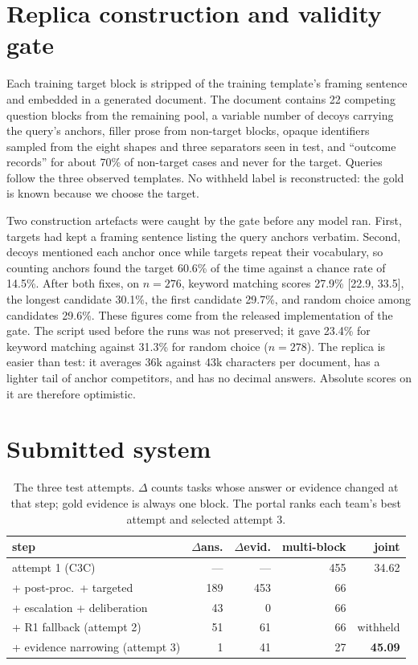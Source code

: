\documentclass[11pt]{article}%
\begin{document}
\appendix
\section{Replica construction and validity gate}
\label{app:replica}

Each training target block is stripped of the training template's framing
sentence and embedded in a generated document. The document contains 22
competing question blocks from the remaining pool, a variable number of
decoys carrying the query's anchors, filler prose from non-target blocks,
opaque identifiers sampled from the eight shapes and three separators seen in
test, and ``outcome records'' for about 70\% of non-target cases and never for
the target. Queries follow the three observed templates. No withheld label is
reconstructed: the gold is known because we choose the target.

Two construction artefacts were caught by the gate before any model ran.
First, targets had kept a framing sentence listing the query anchors
verbatim. Second, decoys mentioned each anchor once while targets repeat their
vocabulary, so counting anchors found the target 60.6\% of the time against a
chance rate of 14.5\%. After both fixes, on $n=276$, keyword matching scores
27.9\% [22.9, 33.5], the longest candidate 30.1\%, the first candidate 29.7\%,
and random choice among candidates 29.6\%. These figures come from the
released implementation of the gate. The script used before the runs was not
preserved; it gave 23.4\% for keyword matching against 31.3\% for random
choice ($n=278$). The replica is easier than test:
it averages 36k against 43k characters per document, has a lighter tail of
anchor competitors, and has no decimal answers. Absolute scores on it are
therefore optimistic.

\section{Submitted system}
\label{app:submitted}

\begin{table}[h]
\centering
\small
\setlength{\tabcolsep}{3.5pt}
\begin{tabularx}{\columnwidth}{>{\raggedright\arraybackslash}Xrrrr}
\toprule
step & $\Delta$ans. & $\Delta$evid. & multi-block & joint \\
\midrule
attempt 1 (\textsc{C3C})          & ---  & ---  & 455 & 34.62 \\
+ post-proc.\ + targeted           & 189  & 453  &  66 & \\
+ escalation + deliberation        &  43  &   0  &  66 & \\
+ R1 fallback (attempt 2)          &  51  &  61  &  66 & withheld \\
+ evidence narrowing (attempt 3)   &   1  &  41  &  27 & \textbf{45.09} \\
\bottomrule
\end{tabularx}
\caption{The three test attempts. $\Delta$ counts tasks whose answer or
evidence changed at that step; gold evidence is always one block. The portal
ranks each team's best attempt and selected attempt 3.}
\label{tab:lineage}
\end{table}
\end{document}
